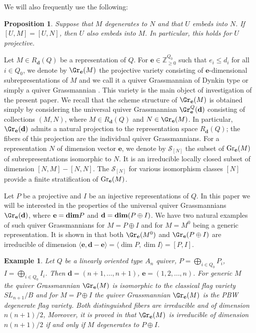 \documentclass{amsart}
\newcommand{\bd}{\mathbf{d}}
\newcommand{\be}{\mathbf{e}}
\newtheorem{example}[theorem]{Example}
\numberwithin{equation}{section}
\newtheorem{prop}[thm]{Proposition}
\theoremstyle{remark}
\newcommand{\bZ}{{\mathbb Z}}
\begin{document}
We will also frequently use the following:

\begin{prop}\label{constremb} \cite[Theorem 2.4]{Bo96}
Suppose that $M$ degenerates to $N$ and that $U$ embeds into $N$. If $[U,M]=[U,N]$, then $U$ 
also embeds into $M$. In particular, this holds for $U$ projective.
\end{prop}

Let $M\in R_\bd(Q)$ be a representation of $Q$. For $\be\in \bZ_{\ge 0}^{Q_0}$ such 
that $e_i\le d_i$
for all $i\in Q_0$, we denote by $\Gr_\be(M)$ the projective variety consisting
of $\be$-dimensional subrepresentations of $M$ and we call it a quiver Grassmannian of 
Dynkin type or simply a quiver Grassmannian
\cite{CI20,CR00}. This variety is the main object of investigation of the present paper. 
We recall that the scheme structure of $\Gr_\be(M)$ is obtained simply by considering the universal 
quiver Grassmannian $\Gr_\be^Q(\bd)$ consisting of collections $(M,N)$, where $M\in R_\bd(Q)$ and 
$N\in \Gr_\be(M)$.
In particular, $\Gr_\be(\bd)$ admits a natural projection to the representation space $R_\bd(Q)$;
the fibers of this projection are the individual quiver Grassmannians. For a representation $N$ 
of dimension vector $\be$, we denote by $\mathcal{S}_{[N]}$ the subset of
${\rm Gr}_{\be}(M)$ of subrepresentations isomorphic to $N$. It is an irreducible locally closed 
subset of dimension $[N,M]-[N,N]$. The $\mathcal{S}_{[N]}$ for various isomorphism classes $[N]$ 
provide a finite stratification of ${\rm Gr}_{\be}(M)$.

Let $P$ be a projective and $I$ be an injective representations of $Q$. 
In this paper we will be interested in the properties of the universal quiver 
Grassmannians $\Gr_\be(\bd)$, where
$\be={\rm\bf dim} P$ and $\bd = {\rm\bf dim}(P\oplus I)$. We have two natural examples of 
such quiver Grassmannians for $M=P\oplus I$ and for $M=M^0$ being a generic representation.
It is shown in \cite{CFR12} that both $\Gr_\be(M^0)$ and $\Gr_\be(P\oplus I)$ are irreducible
of dimension $\langle \be, \bd-\be\rangle = \langle \dim P, \dim I\rangle = [P,I]$.



\begin{example}
Let $Q$ be a linearly oriented type $A_n$ quiver, $P=\bigoplus_{i\in Q_0} P_i$,
$I=\bigoplus_{i\in Q_0} I_i$. Then $\bd=(n+1,\dots,n+1)$, $\be=(1,2,\dots,n)$.
For generic $M$ the quiver Grassmannian $\Gr_\be(M)$ is isomorphic to the classical
flag variety $SL_{n+1}/B$ and for $M=P\oplus I$ the quiver Grassmannian $\Gr_\be(M)$
is the PBW degenerate flag variety. Both distinguished fibers are irreducible and of
dimension $n(n+1)/2$, Moreover, it is proved in \cite{CFFFR17} that $\Gr_\be(M)$
is irreducible of dimension $n(n+1)/2$ if and only if $M$ degenerates to $P\oplus I$.
\end{example}
\end{document}
